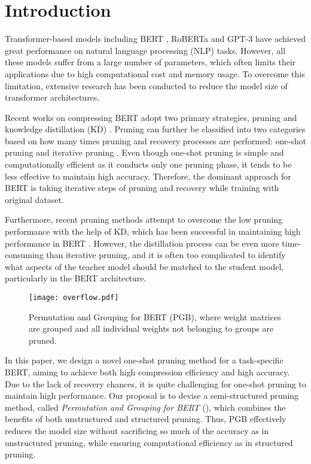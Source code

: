 \section{Introduction}
Transformer-based models \cite{Vaswani2017} including BERT \cite{BERT}, RoBERTa \cite{Roberta} and GPT-3 \cite{GPT} have achieved great performance on natural language processing (NLP) tasks. However, all these models suffer from a large number of parameters, which often limits their applications due to high computational cost and memory usage. To overcome this limitation, extensive research has been conducted to reduce the model size of transformer architectures.

Recent works on compressing BERT adopt two primary strategies, pruning \cite{Han} and knowledge distillation (KD) \cite{KD}. Pruning can further be classified into two categories based on how many times pruning and recovery processes are performed: one-shot pruning \cite{SNIP} and iterative pruning \cite{Thinet,LoB}. Even though one-shot pruning is simple and computationally efficient as it conducts only one pruning phase, it tends to be less effective to maintain high accuracy. Therefore, the dominant approach for BERT is taking iterative steps of pruning and recovery while training with original dataset.

Furthermore, recent pruning methods \cite{DynaBERT,block,Xia} attempt to overcome the low pruning performance with the help of KD, which has been successful in maintaining high performance in BERT \cite{DistilB,TinyBERT}. However, the distillation process can be even more time-consuming than iterative pruning, and it is often too complicated to identify what aspects of the teacher model should be matched to the student model, particularly in the BERT architecture.

\begin{figure}[t!]
    \centering
    \texttt{[image: overflow.pdf]}
    \caption{Permutation and Grouping for BERT (PGB), where weight matrices are grouped and all individual weights not belonging to groups are pruned.}
    \label{fig:overview}
\end{figure}

In this paper, we design a novel one-shot pruning method for a task-specific BERT, aiming to achieve both high compression efficiency and high accuracy. Due to the lack of recovery chances, it is quite challenging for one-shot pruning to maintain high performance. Our proposal is to devise a semi-structured pruning method, called \textit{Permutation and Grouping for BERT} (\ours), which combines the benefits of both unstructured and structured pruning. Thus, PGB effectively reduces the model size without sacrificing so much of the accuracy as in unstructured pruning, while ensuring computational efficiency as in structured pruning.


